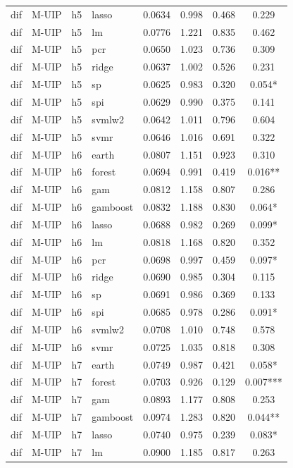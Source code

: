 \begin{ThreePartTable}
\begin{longtable}[t]{llclcccc}
dif & M-UIP & h5 & lasso & 0.0634 & 0.998 & 0.468 & 0.229\\
dif & M-UIP & h5 & lm & 0.0776 & 1.221 & 0.835 & 0.462\\
dif & M-UIP & h5 & pcr & 0.0650 & 1.023 & 0.736 & 0.309\\
dif & M-UIP & h5 & ridge & 0.0637 & 1.002 & 0.526 & 0.231\\
dif & M-UIP & h5 & sp & 0.0625 & 0.983 & 0.320 & 0.054*\\
dif & M-UIP & h5 & spi & 0.0629 & 0.990 & 0.375 & 0.141\\
dif & M-UIP & h5 & svmlw2 & 0.0642 & 1.011 & 0.796 & 0.604\\
dif & M-UIP & h5 & svmr & 0.0646 & 1.016 & 0.691 & 0.322\\
\addlinespace
dif & M-UIP & h6 & earth & 0.0807 & 1.151 & 0.923 & 0.310\\
dif & M-UIP & h6 & forest & 0.0694 & 0.991 & 0.419 & 0.016**\\
dif & M-UIP & h6 & gam & 0.0812 & 1.158 & 0.807 & 0.286\\
dif & M-UIP & h6 & gamboost & 0.0832 & 1.188 & 0.830 & 0.064*\\
dif & M-UIP & h6 & lasso & 0.0688 & 0.982 & 0.269 & 0.099*\\
dif & M-UIP & h6 & lm & 0.0818 & 1.168 & 0.820 & 0.352\\
dif & M-UIP & h6 & pcr & 0.0698 & 0.997 & 0.459 & 0.097*\\
dif & M-UIP & h6 & ridge & 0.0690 & 0.985 & 0.304 & 0.115\\
dif & M-UIP & h6 & sp & 0.0691 & 0.986 & 0.369 & 0.133\\
dif & M-UIP & h6 & spi & 0.0685 & 0.978 & 0.286 & 0.091*\\
dif & M-UIP & h6 & svmlw2 & 0.0708 & 1.010 & 0.748 & 0.578\\
dif & M-UIP & h6 & svmr & 0.0725 & 1.035 & 0.818 & 0.308\\
\addlinespace
dif & M-UIP & h7 & earth & 0.0749 & 0.987 & 0.421 & 0.058*\\
dif & M-UIP & h7 & forest & 0.0703 & 0.926 & 0.129 & 0.007***\\
dif & M-UIP & h7 & gam & 0.0893 & 1.177 & 0.808 & 0.253\\
dif & M-UIP & h7 & gamboost & 0.0974 & 1.283 & 0.820 & 0.044**\\
dif & M-UIP & h7 & lasso & 0.0740 & 0.975 & 0.239 & 0.083*\\
dif & M-UIP & h7 & lm & 0.0900 & 1.185 & 0.817 & 0.263\\

\end{longtable}
\end{ThreePartTable}

